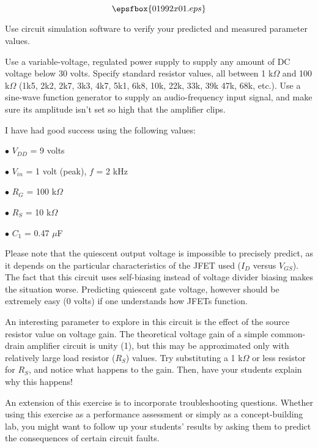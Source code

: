 

$$\epsfbox{01992x01.eps}$$

\vfil \eject






Use circuit simulation software to verify your predicted and measured parameter values.







Use a variable-voltage, regulated power supply to supply any amount of DC voltage below 30 volts.  Specify standard resistor values, all between 1 k$\Omega$ and 100 k$\Omega$ (1k5, 2k2, 2k7, 3k3, 4k7, 5k1, 6k8, 10k, 22k, 33k, 39k 47k, 68k, etc.).  Use a sine-wave function generator to supply an audio-frequency input signal, and make sure its amplitude isn't set so high that the amplifier clips.

I have had good success using the following values:

\medskip
\item{$\bullet$} $V_{DD}$ = 9 volts
\item{$\bullet$} $V_{in}$ = 1 volt (peak), $f$ = 2 kHz
\item{$\bullet$} $R_G$ = 100 k$\Omega$
\item{$\bullet$} $R_S$ = 10 k$\Omega$
\item{$\bullet$} $C_1$ = 0.47 $\mu$F
\medskip

Please note that the quiescent output voltage is impossible to precisely predict, as it depends on the particular characteristics of the JFET used ($I_D$ versus $V_{GS}$).  The fact that this circuit uses self-biasing instead of voltage divider biasing makes the situation worse.  Predicting quiescent gate voltage, however should be extremely easy (0 volts) if one understands how JFETs function.

An interesting parameter to explore in this circuit is the effect of the source resistor value on voltage gain.  The theoretical voltage gain of a simple common-drain amplifier circuit is unity (1), but this may be approximated only with relatively large load resistor ($R_S$) values.  Try substituting a 1 k$\Omega$ or less resistor for $R_S$, and notice what happens to the gain.  Then, have your students explain why this happens!

An extension of this exercise is to incorporate troubleshooting questions.  Whether using this exercise as a performance assessment or simply as a concept-building lab, you might want to follow up your students' results by asking them to predict the consequences of certain circuit faults.




